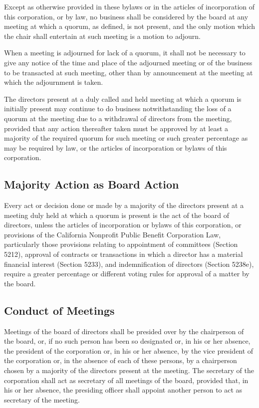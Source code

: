 \documentclass{article}
\begin{document}
	Except as otherwise provided in these bylaws or in the articles of incorporation of this corporation, or by law, no business shall be considered by the board at any meeting at which a quorum, as defined, is not present, and the only motion which the chair shall entertain at such meeting is a motion to adjourn.
	
	When a meeting is adjourned for lack of a quorum, it shall not be necessary to give any notice of the time and place of the adjourned meeting or of the business to be transacted at such meeting, other than by announcement at the meeting at which the adjournment is taken. %
	
	The directors present at a duly called and held meeting at which a quorum is initially present may continue to do business notwithstanding the loss of a quorum at the meeting due to a withdrawal of directors from the meeting, provided that any action thereafter taken must be approved by at least a majority of the required quorum for such meeting or such greater percentage as may be required by law, or the articles of incorporation or bylaws of this corporation.
	
	\subsection{Majority Action as Board Action}
	Every act or decision done or made by a majority of the directors present at a meeting duly held at which a quorum is present is the act of the board of directors, unless the articles of incorporation or bylaws of this corporation, or provisions of the California Nonprofit Public Benefit Corporation Law, particularly those provisions relating to appointment of committees (Section 5212), approval of contracts or transactions in which a director has a material financial interest (Section 5233), and indemnification of directors (Section 5238e), require a greater percentage or different voting rules for approval of a matter by the board.
	
	\subsection{Conduct of Meetings}
	Meetings of the board of directors shall be presided over by the chairperson of the board, or, if no such person has been so designated or, in his or her absence, the president of the corporation or, in his or her absence, by the vice president of the corporation or, in the absence of each of these persons, by a chairperson chosen by a majority of the directors present at the meeting. The secretary of the corporation shall act as secretary of all meetings of the board, provided that, in his or her absence, the presiding officer shall appoint another person to act as secretary of the meeting.
	
\end{document}
